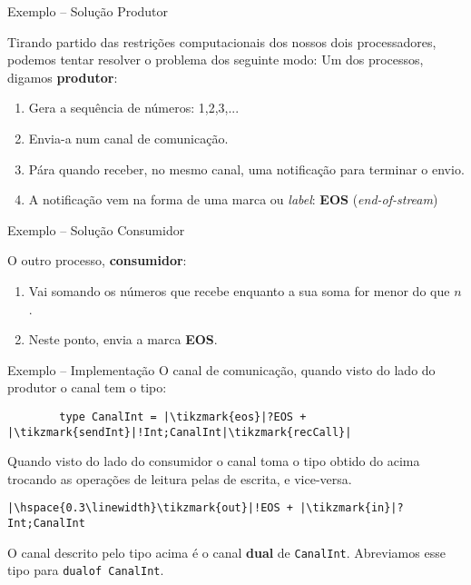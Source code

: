 \begin{frame}{Exemplo -- Solução \hfill \color{mLightBrown}Produtor}

  Tirando partido das restrições computacionais dos nossos dois processadores, podemos tentar resolver o problema dos seguinte modo:
 Um dos processos, digamos \textbf{produtor}:
  \begin{enumerate}
  \item Gera a sequência de números: 1,2,3,...
  \item Envia-a num canal de comunicação.
  \item Pára quando receber, no mesmo canal, uma notificação para terminar o envio.
  \item A notificação vem na forma de uma marca ou \textit{label}: \textbf{EOS} (\textit{end-of-stream})
  \end{enumerate}

\end{frame}


\begin{frame}{Exemplo -- Solução \hfill \color{mLightBrown}Consumidor}

  O outro processo, \textbf{consumidor}:
  \begin{enumerate}
  \item Vai somando os números que recebe enquanto a sua soma for menor do que $n$.
  \item Neste ponto, envia a marca \textbf{EOS}.
  \end{enumerate}
\end{frame}

\begin{frame}[fragile]{Exemplo -- Implementação}
  O canal de comunicação, quando visto do lado do produtor o canal tem o tipo:
  \vspace*{4mm}
  \begin{lstlisting}
        type CanalInt = |\tikzmark{eos}|?EOS + |\tikzmark{sendInt}|!Int;CanalInt|\tikzmark{recCall}|
\end{lstlisting} 

 

 Quando visto do lado do consumidor o canal toma o tipo obtido do acima trocando as operações de leitura pelas de escrita, e vice-versa.
\vspace*{4mm}
\begin{lstlisting}
|\hspace{0.3\linewidth}\tikzmark{out}|!EOS + |\tikzmark{in}|?Int;CanalInt
\end{lstlisting}


\centering
\begin{tcolorbox}
  O canal descrito pelo tipo acima é o canal \textbf{dual} de \lstinline|CanalInt|. Abreviamos esse tipo para \lstinline|dualof CanalInt|.
\end{tcolorbox}

\end{frame}

